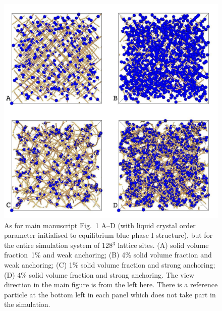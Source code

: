 \documentclass[12pt,twoside]{article}
\begin{document}
\begin{figure}[!h]
\begin{center}
\includegraphics[scale=0.35]{support-fig2.pdf}
\end{center}
\caption{As for main manuscript Fig.~1 A--D
(with liquid crystal order parameter
initialised to equilibrium blue phase I structure), but for the entire
simulation system of 128$^3$ lattice sites. (A)  solid volume fraction~1\%
and weak anchoring;  (B) 4\% solid volume fraction and weak anchoring;
(C) 1\% solid volume fraction and strong anchoring; (D) 4\% solid
volume fraction and strong anchoring. The view direction in the
main figure is from the left here. There is a reference
particle at the bottom left in each panel which does not take part
in the simulation.}
\end{figure}

\newpage
\end{document}
